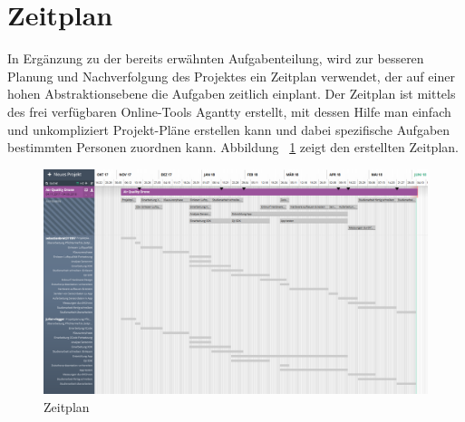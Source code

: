 \section{Zeitplan}\label{sec:Zeitplan}
In Ergänzung zu der bereits erwähnten Aufgabenteilung, wird zur besseren Planung und Nachverfolgung des Projektes ein Zeitplan verwendet, der auf einer hohen Abstraktionsebene die Aufgaben zeitlich einplant. Der Zeitplan ist mittels des frei verfügbaren Online-Tools Agantty erstellt, mit dessen Hilfe man einfach und unkompliziert Projekt-Pläne erstellen kann und dabei spezifische Aufgaben bestimmten Personen zuordnen kann. 
\newline 
\newline
Abbildung ~\ref{fig:Zeitplan} zeigt den erstellten Zeitplan.
\begin{figure}[H]
	\includegraphics[width=\textwidth]{images/Zeitplan.png}	
	\caption{Zeitplan}
	\label{fig:Zeitplan}
\end{figure}


